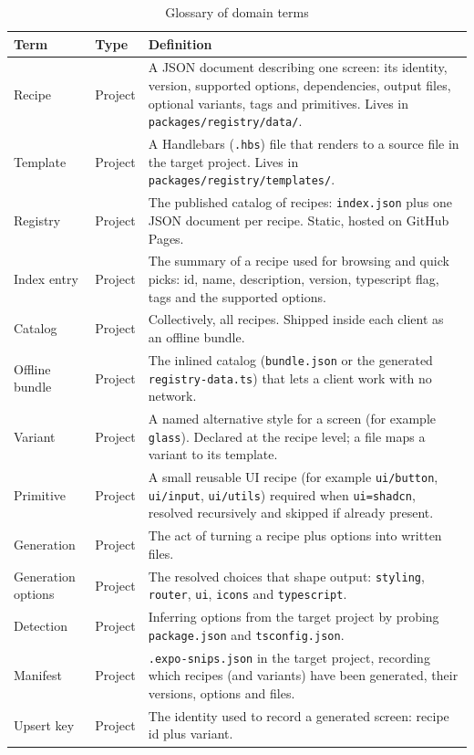 \begin{longtable}{p{3.8cm}p{1.6cm}p{8.8cm}}
\caption{Glossary of domain terms}\\
\toprule
\textbf{Term} & \textbf{Type} & \textbf{Definition} \\
\midrule

Recipe & Project & A JSON document describing one screen: its identity, version,
supported options, dependencies, output files, optional variants, tags and
primitives. Lives in \texttt{packages/registry/data/}. \\
Template & Project & A Handlebars (\texttt{.hbs}) file that renders to a source
file in the target project. Lives in \texttt{packages/registry/templates/}. \\
Registry & Project & The published catalog of recipes: \texttt{index.json} plus
one JSON document per recipe. Static, hosted on GitHub Pages. \\
Index entry & Project & The summary of a recipe used for browsing and quick
picks: id, name, description, version, typescript flag, tags and the supported
options. \\
Catalog & Project & Collectively, all recipes. Shipped inside each client as an
offline bundle. \\
Offline bundle & Project & The inlined catalog (\texttt{bundle.json} or the
generated \texttt{registry-data.ts}) that lets a client work with no network. \\
Variant & Project & A named alternative style for a screen (for example
\texttt{glass}). Declared at the recipe level; a file maps a variant to its
template. \\
Primitive & Project & A small reusable UI recipe (for example \texttt{ui/button},
\texttt{ui/input}, \texttt{ui/utils}) required when \texttt{ui=shadcn}, resolved
recursively and skipped if already present. \\
Generation & Project & The act of turning a recipe plus options into written
files. \\
Generation options & Project & The resolved choices that shape output:
\texttt{styling}, \texttt{router}, \texttt{ui}, \texttt{icons} and
\texttt{typescript}. \\
Detection & Project & Inferring options from the target project by probing
\texttt{package.json} and \texttt{tsconfig.json}. \\
Manifest & Project & \texttt{.expo-snips.json} in the target project, recording
which recipes (and variants) have been generated, their versions, options and
files. \\
Upsert key & Project & The identity used to record a generated screen: recipe id
plus variant. \\
\bottomrule
\end{longtable}

